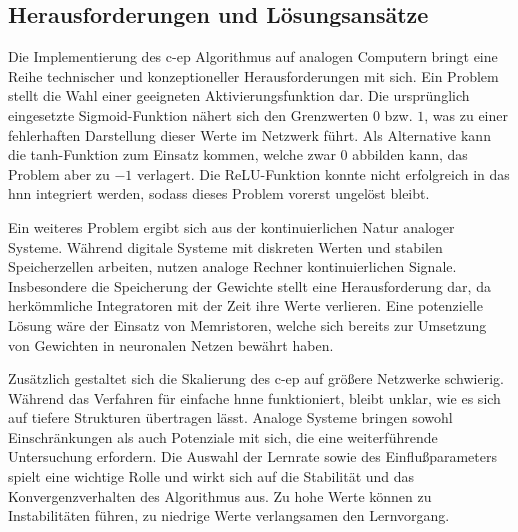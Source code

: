 \subsection{Herausforderungen und Lösungsansätze}

Die Implementierung des \ac{c-ep} Algorithmus auf analogen Computern bringt eine Reihe technischer und konzeptioneller Herausforderungen mit sich. Ein Problem stellt die Wahl einer geeigneten Aktivierungsfunktion dar. Die ursprünglich eingesetzte Sigmoid-Funktion nähert sich den Grenzwerten \(0\) bzw. \(1\), was zu einer fehlerhaften Darstellung dieser Werte im Netzwerk führt. Als Alternative kann die tanh-Funktion zum Einsatz kommen, welche zwar \(0\) abbilden kann, das Problem aber zu \(-1\) verlagert. Die ReLU-Funktion konnte nicht erfolgreich in das \ac{hnn} integriert werden, sodass dieses Problem vorerst ungelöst bleibt.

Ein weiteres Problem ergibt sich aus der kontinuierlichen Natur analoger Systeme. Während digitale Systeme mit diskreten Werten und stabilen Speicherzellen arbeiten, nutzen analoge Rechner kontinuierlichen Signale. Insbesondere die Speicherung der Gewichte stellt eine Herausforderung dar, da herkömmliche Integratoren mit der Zeit ihre Werte verlieren. Eine potenzielle Lösung wäre der Einsatz von Memristoren, welche sich bereits zur Umsetzung von Gewichten in neuronalen Netzen bewährt haben.

Zusätzlich gestaltet sich die Skalierung des \ac{c-ep} auf größere Netzwerke schwierig. Während das Verfahren für einfache \ac{hnn}e funktioniert, bleibt unklar, wie es sich auf tiefere Strukturen übertragen lässt. Analoge Systeme bringen sowohl Einschränkungen als auch Potenziale mit sich, die eine weiterführende Untersuchung erfordern.  Die Auswahl der Lernrate sowie des Einflußparameters spielt eine wichtige Rolle und wirkt sich auf die Stabilität und das Konvergenzverhalten des Algorithmus aus. Zu hohe Werte können zu Instabilitäten führen, zu niedrige Werte verlangsamen den Lernvorgang.
